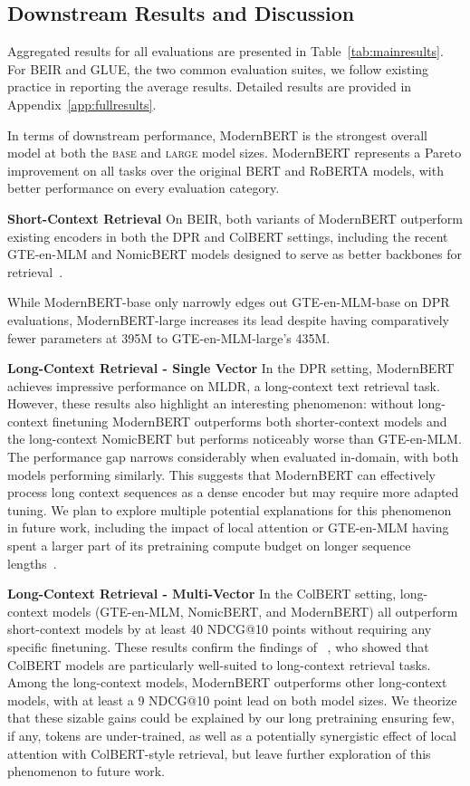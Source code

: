 \documentclass[11pt]{article}
\begin{document}
\subsection{Downstream Results and Discussion}

Aggregated results for all evaluations are presented in Table~\ref{tab:mainresults}. For BEIR and GLUE, the two common evaluation suites, we follow existing practice in reporting the average results. Detailed results are provided in Appendix~\ref{app:fullresults}.

In terms of downstream performance, ModernBERT is the strongest overall model at both the \textsc{base} and \textsc{large} model sizes. ModernBERT represents a Pareto improvement on all tasks over the original BERT and RoBERTA models, with better performance on every evaluation category.

\textbf{Short-Context Retrieval} On BEIR, both variants of ModernBERT outperform existing encoders in both the DPR and ColBERT settings, including the recent GTE-en-MLM and NomicBERT models designed to serve as better backbones for retrieval~\cite{gte,nomic}. 

While ModernBERT-base only narrowly edges out GTE-en-MLM-base on DPR evaluations, ModernBERT-large increases its lead despite having comparatively fewer parameters at 395M to GTE-en-MLM-large's 435M.


\textbf{Long-Context Retrieval - Single Vector} In the DPR setting, ModernBERT achieves impressive performance on MLDR, a long-context text retrieval task. However, these results also highlight an interesting phenomenon: without long-context finetuning ModernBERT outperforms both shorter-context models and the long-context NomicBERT but performs noticeably worse than GTE-en-MLM. The performance gap narrows considerably when evaluated in-domain, with both models performing similarly. This suggests that ModernBERT can effectively process long context sequences as a dense encoder but may require more adapted tuning. We plan to explore multiple potential explanations for this phenomenon in future work, including the impact of local attention or GTE-en-MLM having spent a larger part of its pretraining compute budget on longer sequence lengths~\cite{gte}.

\textbf{Long-Context Retrieval - Multi-Vector} In the ColBERT setting, long-context models (GTE-en-MLM, NomicBERT, and ModernBERT) all outperform short-context models by at least 40 NDCG@10 points without requiring any specific finetuning. These results confirm the findings of ~\citet{vespalongcolbert}, who showed that ColBERT models are particularly well-suited to long-context retrieval tasks. Among the long-context models, ModernBERT outperforms other long-context models, with at least a 9 NDCG@10 point lead on both model sizes. We theorize that these sizable gains could be explained by our long pretraining ensuring few, if any, tokens are under-trained, as well as a potentially synergistic effect of local attention with ColBERT-style retrieval, but leave further exploration of this phenomenon to future work.
\end{document}
